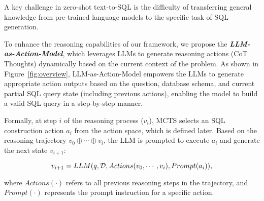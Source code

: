 
A key challenge in zero-shot text-to-SQL is the difficulty of transferring general knowledge from pre-trained language models to the specific task of SQL generation.

To enhance the reasoning capabilities of our framework, we propose the \textit{\textbf{LLM-as-Action-Model}}, which leverages LLMs to generate reasoning actions (\ie CoT Thoughts) dynamically based on the current context of the problem. As shown in Figure~\ref{fig:overview},
LLM-as-Action-Model empowers the LLMs to generate appropriate action outputs based on the question, database schema, and current partial SQL query state (including previous actions), enabling the model to build a valid SQL query in a step-by-step manner. 

Formally, at step $i$ of the reasoning process ($v_i$), MCTS selects an SQL construction action $a_i$ from the action space, which is defined later. Based on the reasoning trajectory $v_0 \oplus \cdots \oplus v_i$, the LLM is prompted to execute $a_i$ and generate the next state $v_{i+1}$:

\begin{equation*}
    \vspace*{-1em}\small
    v_{i+1} = LLM(q, \mathcal{D}, Actions(v_0,\cdots, v_i), Prompt(a_i)),
\end{equation*}

where $Actions(\cdot)$ refers to all previous reasoning steps in the trajectory, and $Prompt(\cdot)$ represents the prompt instruction for a specific action.

